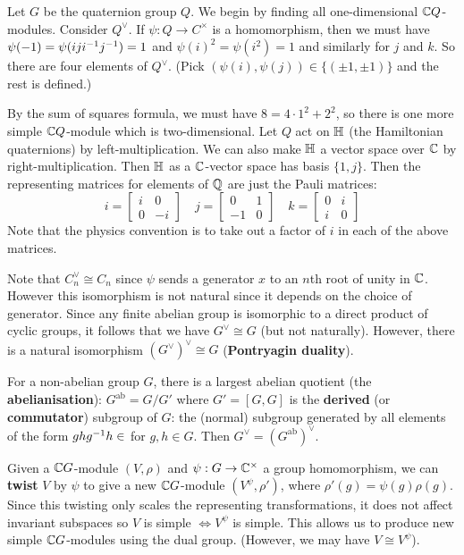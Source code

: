 \begin{exam}
	Let $G$ be the quaternion group $Q$.
	We begin by finding all one-dimensional $\mathbb{C} Q$-modules.
	Consider $Q^\vee$.
	If $\psi: Q \to C^\times$ is a homomorphism, then we must have $\psi(-1) = \psi(iji^{-1} j^{-1}) = 1$ and $\psi(i)^2=\psi(i^2)=1$ and similarly for $j$ and $k$.
	So there are four elements of $Q^\vee$.
	(Pick $(\psi(i),\psi(j)) \in \{(\pm 1, \pm 1)\}$ and the rest is defined.)
	
	By the sum of squares formula, we must have $8=4 \cdot 1^2 + 2^2$, so there is one more simple $\mathbb{C} Q$-module which is two-dimensional.
	Let $Q$ act on $\mathbb{H}$ (the Hamiltonian quaternions) by left-multiplication.
	We can also make $\mathbb{H}$ a vector space over $\mathbb{C}$ by right-multiplication.
	Then $\mathbb{H}$ as a $\mathbb{C}$-vector space has basis $\{1,j\}$.
	Then the representing matrices for elements of $\mathbb{Q}$ are just the Pauli matrices:
	\begin{equation*}
		i=
		\begin{bmatrix}
			i & 0 \\ 0 & -i
		\end{bmatrix}
		\quad
		j=
		\begin{bmatrix}
			0 & 1 \\ -1 & 0
		\end{bmatrix}
		\quad
		k=
		\begin{bmatrix}
			0 & i \\ i & 0
		\end{bmatrix}
	\end{equation*}
	Note that the physics convention is to take out a factor of $i$ in each of the above matrices.
\end{exam}

\begin{rmk}
	Note that $C_n^\vee \cong C_n$ since $\psi$ sends a generator $x$ to an $n$th root of unity in $\mathbb{C}$.
	However this isomorphism is not natural since it depends on the choice of generator.
	Since any finite abelian group is isomorphic to a direct product of cyclic groups, it follows that we have $G^\vee \cong G$ (but not naturally).
	However, there is a natural isomorphism $(G^\vee)^\vee \cong G$ (\textbf{Pontryagin duality}).
	
	For a non-abelian group $G$, there is a largest abelian quotient (the \textbf{abelianisation}): $G^\text{ab} = G/G'$ where $G'=[G,G]$ is the \textbf{derived} (or \textbf{commutator}) subgroup of $G$: the (normal) subgroup generated by all elements of the form $ghg^{-1} h\in$ for $g,h \in G$.
	Then $G^\vee=(G^\text{ab})^\vee$.
	
	Given a $\mathbb{C} G$-module $(V,\rho)$ and $\psi: G \to \mathbb{C}^\times$ a group homomorphism, we can \textbf{twist} $V$ by $\psi$ to give a new $\mathbb{C} G$-module $(V^\psi,\rho')$, where $\rho'(g)=\psi(g)\rho(g)$.
	Since this twisting only scales the representing transformations, it does not affect invariant subspaces so $V$ is simple $\iff V^\psi$ is simple.
	This allows us to produce new simple $\mathbb{C} G$-modules using the dual group.
	(However, we may have $V \cong V^\psi$).
\end{rmk}

